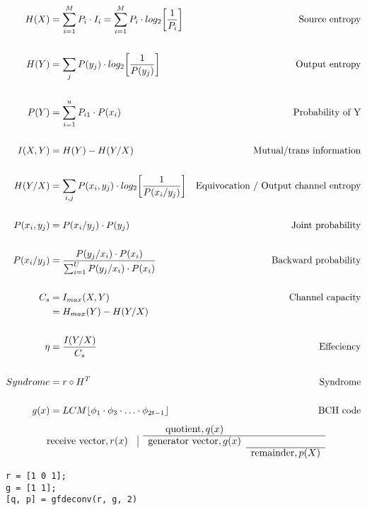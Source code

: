 \documentclass[Main]{subfiles}
\begin{document}
\begin{align*}
H(X) &= \sum_{i=1}^M P_i\cdot I_i = \sum_{i=1}^M P_i\cdot log_2\bigg[\dfrac{1}{P_i}\bigg] & \text{Source entropy}
\\
\\
H(Y) &= \sum_j P(y_j)\cdot log_2 \bigg[\dfrac{1}{P(y_j)}\bigg] &\text{Output entropy}
\\
\\
P(Y) &= \sum_{i=1}^u P_{i1} \cdot P(x_i) &\text{Probability of Y}
\\
\\
I(X,Y) &= H(Y) - H(Y/X) &\text{Mutual/trans information}
\\
\\
H(Y/X) &= \sum_{i,j} P(x_i, y_j) \cdot log_2\bigg[\dfrac{1}{P(x_i/y_j)}\bigg] & \text{Equivocation / Output channel entropy}
\\
\\
P(x_i, y_j) &= P(x_i/y_j) \cdot P(y_j) & \text{Joint probability}
\\
\\
P(x_i/y_j) &= \dfrac{P(y_j/x_i)\cdot P(x_i)}{\sum_{i=1}^U P(y_j/x_i)\cdot P(x_i)} & \text{Backward probability}
\\
\\
C_s &= I_{max}(X,Y) & \text{Channel capacity}\\
	&= H_{max}(Y) - H(Y/X)
\\
\\
\eta &= \dfrac{I(Y/X)}{C_s}	& \text{Effeciency}
\\
\\
Syndrome &= r \circ H^T & \text{Syndrome}
\\
\\
g(x) &= LCM \lfloor \phi_1 \cdot \phi_3 \cdot \ldots \cdot \phi_{2t-1}\rfloor & \text{BCH code}
\end{align*}
\[
\begin{array}{cccccccccccccccccc}
&& \text{quotient}, q(x)  &\\
\cline{3-4}
\text{receive vector}, r(x) &\vline & \text{generator vector}, g(x)  \\
\cline{4-4}
& & & \text{remainder}, p(X)
\end{array}
\]


\begin{lstlisting}[caption=Polynomial division, style=Code-Matlab, label=lst:PolDiv]
r = [1 0 1];
g = [1 1];
[q, p] = gfdeconv(r, g, 2)
\end{lstlisting}
\end{document}
